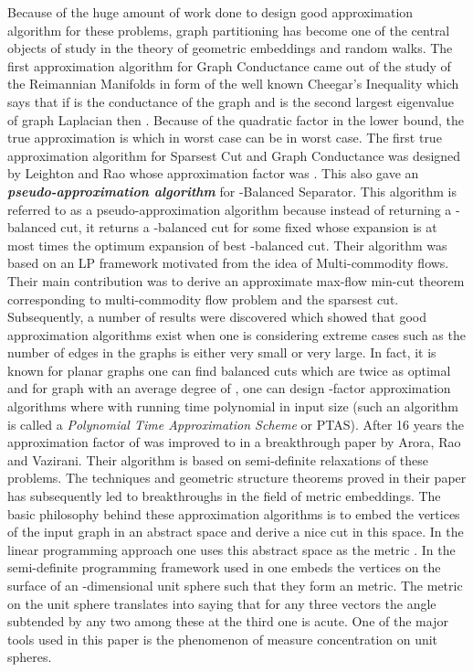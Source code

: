 \documentclass [11pt,a4paper]{article}
\begin{document}
Because of the huge amount of work done to design good approximation algorithm for these problems, 
graph partitioning has become one of the central objects of study in the theory of geometric 
embeddings and random walks. The first approximation algorithm for {\sc Graph Conductance}
came out of the study of the Reimannian Manifolds in form of the well known Cheegar's Inequality \cite{C70}
which says that if  is the conductance of the graph and  is the second largest 
eigenvalue of graph Laplacian then . 
Because of the quadratic factor in the lower bound, the true approximation is  which 
in worst case can be  in worst case. The first true approximation algorithm for {\sc Sparsest Cut}
and {\sc Graph Conductance} was designed by Leighton and Rao \cite{LR99} whose approximation factor was . 
This also gave an   \textbf{\emph{pseudo-approximation algorithm}} for {\sc -Balanced Separator}. This
algorithm is referred to as a pseudo-approximation algorithm because 
instead of returning a -balanced cut, it returns a -balanced cut for some fixed  whose 
expansion is at most  times the optimum expansion of best -balanced cut. Their algorithm
was based on an LP framework motivated from the idea of Multi-commodity flows. Their main contribution
was to derive an approximate max-flow min-cut theorem corresponding to multi-commodity flow problem 
and the sparsest cut. Subsequently, a number of results
were discovered which showed that good approximation algorithms exist when one is considering
extreme cases such as the number of edges in the graphs is either very small or very large. In fact,
it is known for planar graphs one can find balanced cuts which are twice as optimal \cite{GSV94} and for 
graph with an average degree of , one can design -factor approximation algorithms
where  with running time polynomial in input size \cite{AKK} (such an algorithm is called a 
\emph{Polynomial Time Approximation Scheme} or PTAS). After 16 years the approximation factor
of  was improved to  in a breakthrough paper by Arora, Rao and Vazirani.
Their algorithm is based on semi-definite relaxations of these problems. 
The techniques and geometric structure theorems proved in their paper has subsequently led to breakthroughs
in the field of metric embeddings. The basic philosophy behind these approximation algorithms is to embed the
vertices of the input graph in an abstract space and derive a nice cut in this space. In the
linear programming approach one uses this abstract space as the  metric \cite{LR99, LLR95, V02}. In the semi-definite 
programming framework used in \cite{ARV} one embeds the vertices on the surface of an -dimensional unit sphere
such that they form an  metric. The  metric on the unit sphere translates into saying that for any three vectors
the angle subtended by any two among these at the third one is acute. 
One of the major tools used in this paper is the phenomenon of measure concentration on unit spheres. 
\end{document}
